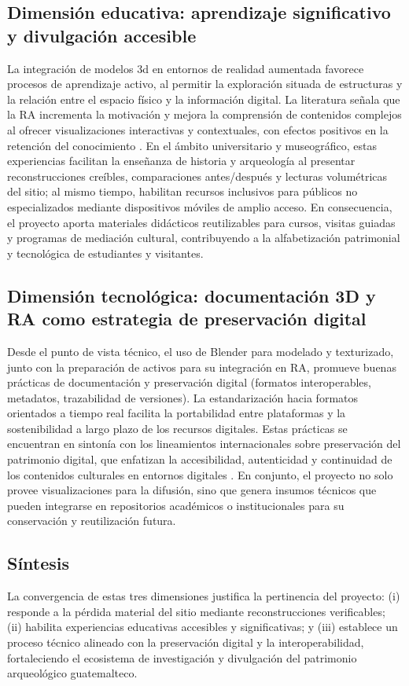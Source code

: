 \subsection*{Dimensión educativa: aprendizaje significativo y divulgación accesible}
La integración de modelos \gls{3d} en entornos de realidad aumentada favorece procesos de aprendizaje activo, al permitir la exploración situada de estructuras y la relación entre el espacio físico y la información digital. La literatura señala que la RA incrementa la motivación y mejora la comprensión de contenidos complejos al ofrecer visualizaciones interactivas y contextuales, con efectos positivos en la retención del conocimiento \cite{Barroso2022,Sevilla2017,Handley2024}. En el ámbito universitario y museográfico, estas experiencias facilitan la enseñanza de historia y arqueología al presentar reconstrucciones creíbles, comparaciones antes/después y lecturas volumétricas del sitio; al mismo tiempo, habilitan recursos inclusivos para públicos no especializados mediante dispositivos móviles de amplio acceso. En consecuencia, el proyecto aporta materiales didácticos reutilizables para cursos, visitas guiadas y programas de mediación cultural, contribuyendo a la alfabetización patrimonial y tecnológica de estudiantes y visitantes.

\subsection*{Dimensión tecnológica: documentación 3D y RA como estrategia de preservación digital}
Desde el punto de vista técnico, el uso de Blender para modelado y texturizado, junto con la preparación de activos para su integración en \gls{RA}, promueve buenas prácticas de documentación y preservación digital (formatos interoperables, metadatos, trazabilidad de versiones). La estandarización hacia formatos orientados a tiempo real  facilita la portabilidad entre plataformas y la sostenibilidad a largo plazo de los recursos digitales. Estas prácticas se encuentran en sintonía con los lineamientos internacionales sobre preservación del patrimonio digital, que enfatizan la accesibilidad, autenticidad y continuidad de los contenidos culturales en entornos digitales \cite{UNESCO2003Charter}. En conjunto, el proyecto no solo provee visualizaciones para la difusión, sino que genera insumos técnicos que pueden integrarse en repositorios académicos o institucionales para su conservación y reutilización futura.

\subsection*{Síntesis}
La convergencia de estas tres dimensiones justifica la pertinencia del proyecto: (i) responde a la pérdida material del sitio mediante reconstrucciones verificables; (ii) habilita experiencias educativas accesibles y significativas; y (iii) establece un proceso técnico alineado con la preservación digital y la interoperabilidad, fortaleciendo el ecosistema de investigación y divulgación del patrimonio arqueológico guatemalteco.